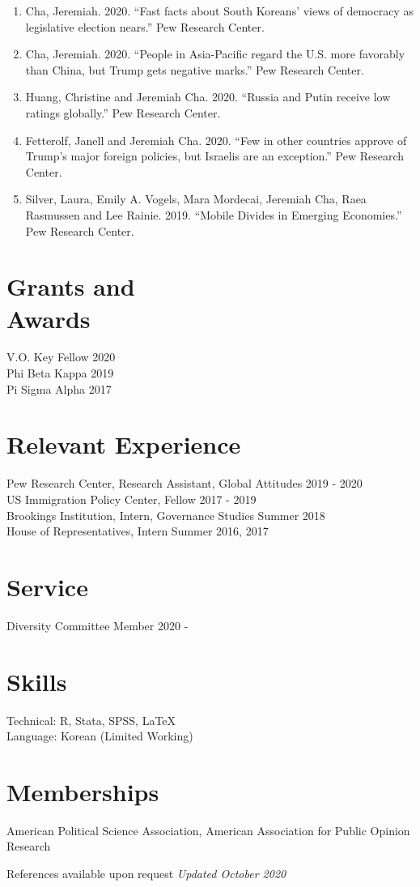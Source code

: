 \documentclass[margin, line]{res}
\begin{document}
\begin{resume}
\begin{enumerate}
\item Cha, Jeremiah. 2020. ``Fast facts about South Koreans’ views of democracy as legislative election nears.'' Pew Research Center.

\item Cha, Jeremiah. 2020. ``People in Asia-Pacific regard the U.S. more favorably than China, but Trump gets negative marks.'' Pew Research Center.

\item Huang, Christine and Jeremiah Cha. 2020. ``Russia and Putin receive low ratings globally.'' Pew Research Center.

\item Fetterolf, Janell and Jeremiah Cha. 2020. ``Few in other countries approve of Trump’s major foreign policies, but Israelis are an exception.'' Pew Research Center.

\item Silver, Laura, Emily A. Vogels, Mara Mordecai, Jeremiah Cha, Raea Rasmussen and Lee Rainie. 2019. ``Mobile Divides in Emerging Economies.'' Pew Research Center.

\end{enumerate}

\section{Grants and \\Awards}  
V.O. Key Fellow \hfill 2020\\
Phi Beta Kappa \hfill 2019\\
Pi Sigma Alpha \hfill 2017

\section{Relevant Experience}
Pew Research Center, Research Assistant, Global Attitudes \hfill 2019 - 2020\\
US Immigration Policy Center, Fellow \hfill 2017 - 2019\\
Brookings Institution, Intern, Governance Studies \hfill Summer 2018\\
House of Representatives, Intern \hfill Summer 2016, 2017

\section{Service}
Diversity Committee Member \hfill 2020 -

\section{Skills} 
Technical: R, Stata, SPSS, \LaTeX\\
Language: Korean (Limited Working)

\section{Memberships}
American Political Science Association, American Association for Public Opinion Research

\small{References available upon request} \hfill \small{\textit{Updated October 2020}}

\end{resume}
\end{document}

